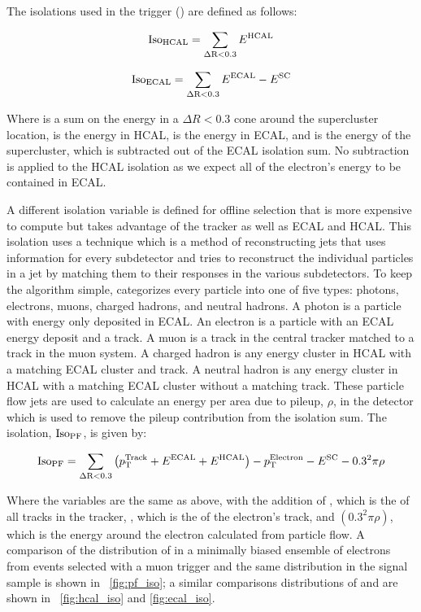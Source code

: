 The isolations used in the trigger (\SingleElectronTrigger) are defined as
follows:

\begin{equation}
    \text{Iso}_{\text{HCAL}} = \sum_{\Delta \text{R}<0.3} E^{\text{HCAL}}
\end{equation}

\begin{equation}
    \text{Iso}_{\text{ECAL}} = \sum_{\Delta \text{R}<0.3} E^{\text{ECAL}} - E^{\text{SC}}
\end{equation}

Where \DeltaRSum is a sum on the energy in a $\Delta R < 0.3$ cone around the
supercluster location, \EHCAL is the energy in HCAL, \EECAL is the energy in
ECAL, and \ESC is the energy of the supercluster, which is subtracted out of
the ECAL isolation sum. No subtraction is applied to the HCAL isolation as we
expect all of the electron's energy to be contained in ECAL.

A different isolation variable is defined for offline selection that is more
expensive to compute but takes advantage of the tracker as well as ECAL and
HCAL. This isolation uses a \particleflow\cite{particle_flow_2010} technique
which is a method of reconstructing jets that uses information for every
subdetector and tries to reconstruct the individual particles in a jet by
matching them to their responses in the various subdetectors. To keep the
algorithm simple, \particleflow categorizes every particle into one of five
types: photons, electrons, muons, charged hadrons, and neutral hadrons. A
photon is a particle with energy only deposited in ECAL. An electron is a
particle with an ECAL energy deposit and a track. A muon is a track in the
central tracker matched to a track in the muon system. A charged hadron is any
energy cluster in HCAL with a matching ECAL cluster and track. A neutral hadron
is any energy cluster in HCAL with a matching ECAL cluster without a matching
track. These particle flow jets are used to calculate an energy per area due to
pileup, $\rho$, in the detector which is used to remove the pileup contribution
from the isolation sum. The \particleflow isolation, $\text{Iso}_{\text{PF}}$, is given by:

\begin{equation}
    \text{Iso}_{\text{PF}} = \sum_{\Delta \text{R}<0.3} \left(p_{\mathrm{T}}^{\text{Track}} + E^{\text{ECAL}} + E^{\text{HCAL}}\right) - p_{\mathrm{T}}^{\text{Electron}}
    - E^{\text{SC}} - 0.3^{2} \pi \rho
\end{equation}

Where the variables are the same as above, with the addition of \ptTrack, which
is the \pt of all tracks in the tracker, \ptElectron, which is the \pt of the
electron's track, and $\left(0.3^{2} \pi \rho\right)$, which is the energy
around the electron calculated from particle flow. A comparison of the
distribution of \PFISO in a minimally biased ensemble of electrons from events
selected with a muon trigger and the same distribution in the \MADGRAPH signal
sample is shown in \FIG~\ref{fig:pf_iso}; a similar comparisons distributions
of \HCALISO and \ECALISO are shown in \FIGS~\ref{fig:hcal_iso} and
\ref{fig:ecal_iso}.

